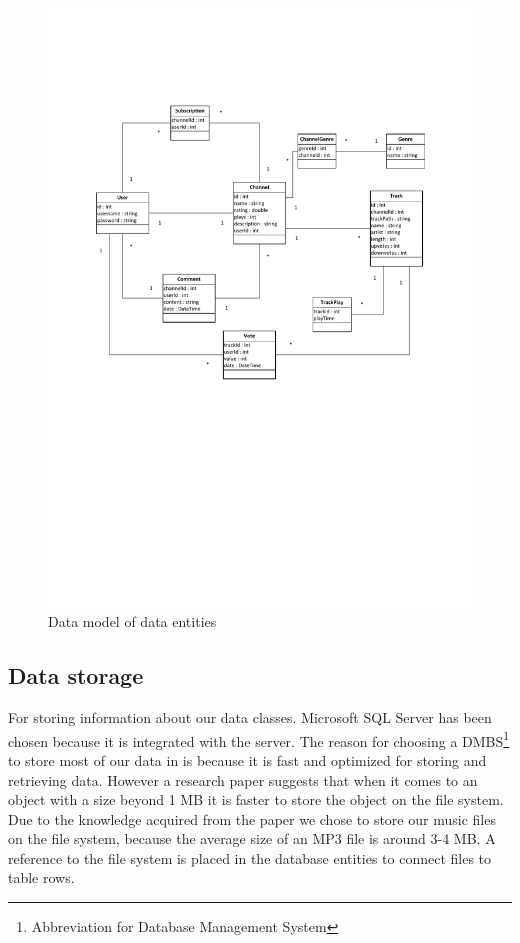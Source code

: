 \documentclass[a4paper,11pt,report]{article}
\begin{document}
\begin{figure}[H]
  \centering
\includegraphics[width=420pt,keepaspectratio=true,trim=60pt 300pt 60pt 80pt]{./ermodel.pdf}
\caption{Data model of data entities}
\end{figure}
\subsection{Data storage}
For storing information about our data classes. Microsoft SQL Server has been chosen because it is integrated with the server. The reason for choosing a DMBS\footnote[1]{Abbreviation for Database Management System} to store most of our data in is because it is fast and optimized for storing and retrieving data. However a research paper\cite{Russel} suggests that when it comes to an object with a size beyond 1 MB it is faster to store the object on the file system. Due to the knowledge acquired from the paper we chose to store our music files on the file system, because the average size of an MP3 file is around 3-4 MB. A reference to the file system is placed in the database entities to connect files to table rows.
\end{document}
